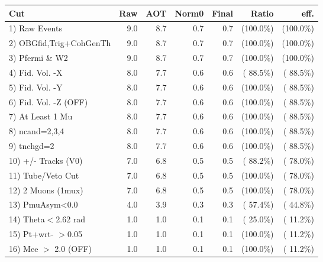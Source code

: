  \begin{table}[h!]\centering
 \begin{tabular}{||l||r|r|r|r|r|r||}
 \hline
 \hline
 Cut & Raw & AOT & Norm0 & Final & Ratio & eff.       \\
 \hline
  1) Raw Events           &          9.0 &          8.7 &          0.7 &          0.7 & (100.0\%) & (100.0\%) \\
  2) OBGfid,Trig+CohGenTh &          9.0 &          8.7 &          0.7 &          0.7 & (100.0\%) & (100.0\%) \\
  3) Pfermi \& W2         &          9.0 &          8.7 &          0.7 &          0.7 & (100.0\%) & (100.0\%) \\
  4) Fid. Vol. -X         &          8.0 &          7.7 &          0.6 &          0.6 & ( 88.5\%) & ( 88.5\%) \\
  5) Fid. Vol. -Y         &          8.0 &          7.7 &          0.6 &          0.6 & (100.0\%) & ( 88.5\%) \\
  6) Fid. Vol. -Z (OFF)   &          8.0 &          7.7 &          0.6 &          0.6 & (100.0\%) & ( 88.5\%) \\
  7) At Least 1 Mu        &          8.0 &          7.7 &          0.6 &          0.6 & (100.0\%) & ( 88.5\%) \\
  8) ncand=2,3,4          &          8.0 &          7.7 &          0.6 &          0.6 & (100.0\%) & ( 88.5\%) \\
  9) tnchgd=2             &          8.0 &          7.7 &          0.6 &          0.6 & (100.0\%) & ( 88.5\%) \\
 10) +/- Tracks (V0)      &          7.0 &          6.8 &          0.5 &          0.5 & ( 88.2\%) & ( 78.0\%) \\
 11) Tube/Veto Cut        &          7.0 &          6.8 &          0.5 &          0.5 & (100.0\%) & ( 78.0\%) \\
 12) 2 Muons (1mux)       &          7.0 &          6.8 &          0.5 &          0.5 & (100.0\%) & ( 78.0\%) \\
 13) PmuAsym<0.0          &          4.0 &          3.9 &          0.3 &          0.3 & ( 57.4\%) & ( 44.8\%) \\
 14) Theta$<$2.62 rad     &          1.0 &          1.0 &          0.1 &          0.1 & ( 25.0\%) & ( 11.2\%) \\
 15) Pt+wrt- $>$0.05      &          1.0 &          1.0 &          0.1 &          0.1 & (100.0\%) & ( 11.2\%) \\
 16) Mee $>$ 2.0  (OFF)   &          1.0 &          1.0 &          0.1 &          0.1 & (100.0\%) & ( 11.2\%) \\

\end{tabular}
\end{table}
